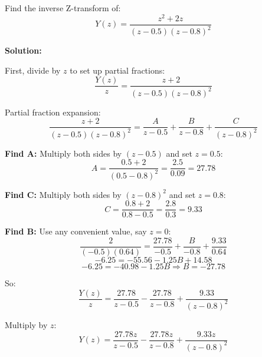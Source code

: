 \begin{example}
\label{ex:inverse_z}

Find the inverse Z-transform of:
\begin{equation}
Y(z) = \frac{z^2 + 2z}{(z - 0.5)(z - 0.8)^2}
\end{equation}

\textbf{Solution:}

First, divide by $z$ to set up partial fractions:
\begin{equation}
\frac{Y(z)}{z} = \frac{z + 2}{(z - 0.5)(z - 0.8)^2}
\end{equation}

Partial fraction expansion:
\begin{equation}
\frac{z + 2}{(z - 0.5)(z - 0.8)^2} = \frac{A}{z - 0.5} + \frac{B}{z - 0.8} + \frac{C}{(z - 0.8)^2}
\end{equation}

\textbf{Find A:} Multiply both sides by $(z - 0.5)$ and set $z = 0.5$:
\begin{equation}
A = \frac{0.5 + 2}{(0.5 - 0.8)^2} = \frac{2.5}{0.09} = 27.78
\end{equation}

\textbf{Find C:} Multiply both sides by $(z - 0.8)^2$ and set $z = 0.8$:
\begin{equation}
C = \frac{0.8 + 2}{0.8 - 0.5} = \frac{2.8}{0.3} = 9.33
\end{equation}

\textbf{Find B:} Use any convenient value, say $z = 0$:
\begin{equation}
\frac{2}{(-0.5)(0.64)} = \frac{27.78}{-0.5} + \frac{B}{-0.8} + \frac{9.33}{0.64}
\end{equation}
\begin{equation}
-6.25 = -55.56 - 1.25B + 14.58
\end{equation}
\begin{equation}
-6.25 = -40.98 - 1.25B \Rightarrow B = -27.78
\end{equation}

So:
\begin{equation}
\frac{Y(z)}{z} = \frac{27.78}{z - 0.5} - \frac{27.78}{z - 0.8} + \frac{9.33}{(z - 0.8)^2}
\end{equation}

Multiply by $z$:
\begin{equation}
Y(z) = \frac{27.78z}{z - 0.5} - \frac{27.78z}{z - 0.8} + \frac{9.33z}{(z - 0.8)^2}
\end{equation}


\end{example}
